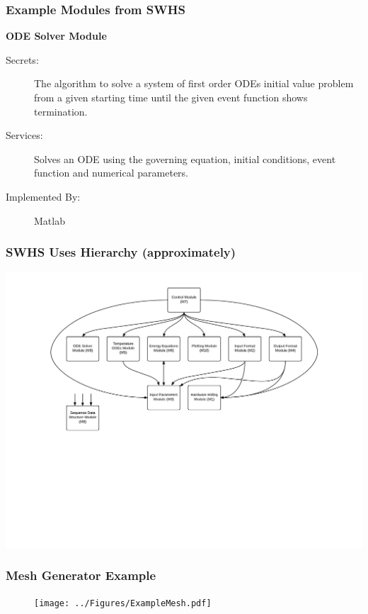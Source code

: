 \documentclass[t,12pt,numbers,fleqn]{beamer}
\begin{document}
\begin{frame}
\frametitle{Example Modules from SWHS}

\textbf{ODE Solver Module}

\begin{description}
\item[Secrets:] The algorithm to solve a system of first order ODEs initial
  value problem from a given starting time until the given event function shows
  termination.
\item[Services:] Solves an ODE using the governing equation, initial
  conditions, event function and numerical parameters.
\item[Implemented By:] Matlab
\end{description}

\end{frame}


\begin{frame}

\frametitle{SWHS Uses Hierarchy (approximately)}

\begin{center}
\includegraphics[scale=0.55]{../Figures/UsesHierarchy.pdf}
\end{center}

\end{frame}


\begin{frame}
\frametitle{Mesh Generator Example}
\vspace{-1cm}
\begin{figure}[H]
\texttt{[image: ../Figures/ExampleMesh.pdf]}
\end{figure}\end{frame}
\end{document}
